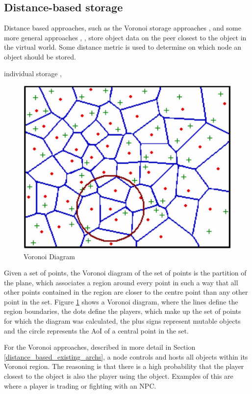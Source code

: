 \documentclass[10pt,a4paper,conference]{IEEEtran}
\begin{document}


\subsection{Distance-based storage}

Distance based approaches, such as the Voronoi storage approaches \cite{Buyukkaya_voronoi_state_management}, \cite{Hu_voronoi_IM} and some more
general approaches \cite{colyseus_distance_based}, \cite{solipsis}, store object data on the peer closest to the object in the virtual world. Some
distance metric is used to determine on which node an object should be stored.

individual storage \cite{individual_storage1}, \cite{cheat_proof_playout}

\begin{figure}[htbp]
 \centering
 \includegraphics[width=0.7\columnwidth]{voronoi_diagram}
 \caption{Voronoi Diagram \cite{Buyukkaya_voronoi_state_management}}
 \label{fig_voronoi_diagram}
\end{figure}
%
Given a set of points, the Voronoi diagram of the set of points is the partition of the plane, which associates a region around every point in such a
way that all other points contained in the region are closer to the centre point than any other point in the set. Figure \ref{fig_voronoi_diagram}
shows a Voronoi diagram, where the lines define the region boundaries, the dots define the players, which make up the set of points for which the
diagram was calculated, the plus signs represent mutable objects and the circle represents the AoI of a central point in the set.

For the Voronoi approaches, described in more detail in Section \ref{distance_based_existing_archs}, a node controls and hosts all objects within its
Voronoi region. The reasoning is that there is a high probability that the player closest to the object is also the player using the object. Examples
of this are where a player is trading or fighting with an NPC.
\end{document}
